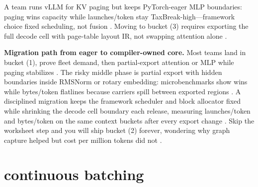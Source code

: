\begin{example}
A team runs vLLM for KV paging but keeps PyTorch-eager MLP boundaries: paging wins capacity while launches/token stay TaxBreak-high---framework choice fixed scheduling, not fusion \citep{kwon2023vllm,taxbreak2026,patel2025llminference,yirage2026,memoryfloor2026}. Moving to bucket (3) requires exporting the full decode cell with page-table layout IR, not swapping attention alone \citep{yirage2026,chen2020compilerbasedhardw,kwon2023vllm,dao2022flashattention}.
\end{example}

\textbf{Migration path from eager to compiler-owned core.} Most teams land in bucket (1), prove fleet demand, then partial-export attention or MLP while paging stabilizes \citep{kwon2023vllm,patel2025llminference,taxbreak2026,memoryfloor2026,yirage2026,chen2020compilerbasedhardw,dlbook}. The risky middle phase is partial export with hidden boundaries inside RMSNorm or rotary embedding: microbenchmarks show wins while bytes/token flatlines because carriers spill between exported regions \citep{dao2022flashattention,dao2023flashdecoding,memoryfloor2026,yirage2026,chen2020compilerbasedhardw,patel2025llminference,taxbreak2026,kwon2023vllm,dlbook}. A disciplined migration keeps the framework scheduler and block allocator fixed while shrinking the decode cell boundary each release, measuring launches/token and bytes/token on the same context buckets after every export change \citep{taxbreak2026,memoryfloor2026,patel2025llminference,yirage2026,chen2020compilerbasedhardw,kwon2023vllm,nvidia2024cudagraphs,dao2022flashattention,liu2024deepseekv3,semianalysis2024tma,amd2024xdna,amd2024aie,dlbook}. Skip the worksheet step and you will ship bucket (2) forever, wondering why graph capture helped but cost per million tokens did not \citep{memoryfloor2026,nvidia2024cudagraphs,taxbreak2026,patel2025llminference,yirage2026,chen2020compilerbasedhardw,kwon2023vllm,dlbook}.

\section{continuous batching}
\label{sec:ch28_continuous_batching}


